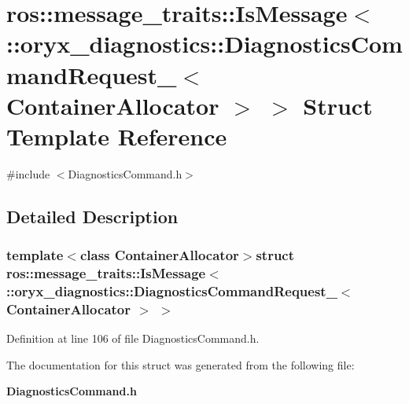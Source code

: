 \section{ros\-:\-:message\-\_\-traits\-:\-:\-Is\-Message$<$ \-:\-:oryx\-\_\-diagnostics\-:\-:\-Diagnostics\-Command\-Request\-\_\-$<$ \-Container\-Allocator $>$ $>$ \-Struct \-Template \-Reference}
\label{structros_1_1message__traits_1_1IsMessage_3_01_1_1oryx__diagnostics_1_1DiagnosticsCommandRequest658fd79df736651a26a154a49d7053d4}


{\ttfamily \#include $<$\-Diagnostics\-Command.\-h$>$}



\subsection{\-Detailed \-Description}
\subsubsection*{template$<$class Container\-Allocator$>$struct ros\-::message\-\_\-traits\-::\-Is\-Message$<$ \-::oryx\-\_\-diagnostics\-::\-Diagnostics\-Command\-Request\-\_\-$<$ Container\-Allocator $>$ $>$}



\-Definition at line 106 of file \-Diagnostics\-Command.\-h.



\-The documentation for this struct was generated from the following file\-:\begin{DoxyCompactItemize}
\item 
{\bf \-Diagnostics\-Command.\-h}\end{DoxyCompactItemize}
